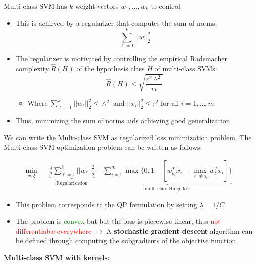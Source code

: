 \documentclass[12pt, a4paper]{article}
\begin{document}
\bigskip

Multi-class SVM has $k$ weight vectors $w_1 ,... , w_k$ to control
\begin{itemize}
  \item This is achieved by a regularizer that computes the sum of norms:
  $$
  \sum_{\ell=1}^k ||w||_2^2
  $$
  \item The regularizer is motivated by controlling the empirical Rademacher complexity $\hat{R}(H)$ of the hypothesis class $H$ of multi-class SVMs:
  $$
  \hat{R}(H) \leq \sqrt{\frac{r^2 \wedge^2}{m}}
  $$
  \begin{itemize}
    \item Where $\sum_{\ell=1}^k ||w_\ell||_2^2 \leq \wedge^2$ and $||x_i||_2^2 \leq r^2$ for all $i=1,...,m$
  \end{itemize}
  \item Thus, minimizing the sum of norms aids achieving good generalization
\end{itemize}


We can write the Multi-class SVM as regularized loss minimization problem. The Multi-class SVM optimization problem can be written as follows:

$$
\begin{aligned}
\min_{w,\xi} \quad & \underbrace{\frac{\delta}{2} \sum_{\ell=1}^{k} ||w_\ell||_2^2}_\text{Regularization} + \underbrace{\sum_{i=1}^m \max{\{0, 1-[w_{y_i}^T x_i - \max_{\ell \neq y_i} w_\ell^T x_i]\}}}_\text{multi-class Hinge loss}
\end{aligned}
$$

\begin{itemize}
  \item This problem corresponds to the QP formulation by setting $\lambda = 1/C$
  \item The problem is \textcolor{Green}{convex} but but the loss is piecewise linear, thus \textcolor{red}{not differentiable everywhere} $\rightarrow$ A \textbf{stochastic gradient descent} algorithm can be defined through computing the subgradients of the objective function
\end{itemize}



\textbf{Multi-class SVM with kernels:}
\end{document}
